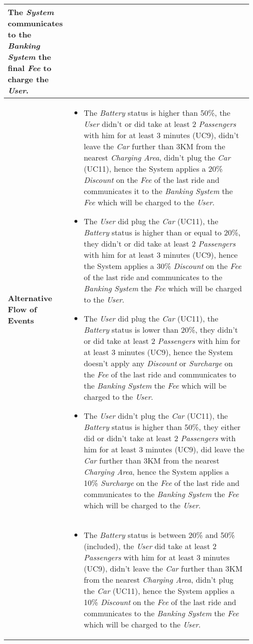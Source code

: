 \begin{longtable}{|p{0.2\linewidth} p{0.8\linewidth}|}
	The \emph{System} communicates to the \emph{Banking System} the final \emph{Fee} to charge the \emph{User}. \\ \hline
	\textbf{Alternative Flow of Events} & 
	\begin{itemize}
		\item The \emph{Battery} status is higher than 50\%, the \emph{User} didn't or did take at least 2 \emph{Passengers} with him for at least 3 minutes (UC9), didn't leave the \emph{Car} further than 3KM from the nearest \emph{Charging Area}, didn't plug the \emph{Car} (UC11), hence the System applies a 20\% \emph{Discount} on the \emph{Fee} of the last ride and communicates it to the \emph{Banking System} the \emph{Fee} which will be charged to the \emph{User}.
		\item The \emph{User} did plug the \emph{Car} (UC11), the \emph{Battery} status is higher than or equal to 20\%, they didn't or did take at least 2 \emph{Passengers} with him for at least 3 minutes (UC9), hence the System applies a 30\% \emph{Discount} on the \emph{Fee} of the last ride and communicates to the \emph{Banking System} the \emph{Fee} which will be charged to the \emph{User}.
		\item The \emph{User} did plug the \emph{Car} (UC11), the \emph{Battery} status is lower than 20\%, they didn't or did take at least 2 \emph{Passengers} with him for at least 3 minutes (UC9), hence the System doesn't apply any \emph{Discount} or \emph{Surcharge} on the \emph{Fee} of the last ride and communicates to the \emph{Banking System} the \emph{Fee} which will be charged to the \emph{User}.
		\item The \emph{User} didn't plug the \emph{Car} (UC11), the \emph{Battery} status is higher than 50\%, they either did or didn't take at least 2 \emph{Passengers} with him for at least 3 minutes (UC9), did leave the \emph{Car} further than 3KM from the nearest \emph{Charging Area}, hence the System applies a 10\% \emph{Surcharge} on the \emph{Fee} of the last ride and communicates to the \emph{Banking System} the \emph{Fee} which will be charged to the \emph{User}.
		\end{itemize} \\ &
		\begin{itemize}
		\item The \emph{Battery} status is between 20\% and 50\% (included), the \emph{User} did take at least 2 \emph{Passengers} with him for at least 3 minutes (UC9), didn't leave the \emph{Car} further than 3KM from the nearest \emph{Charging Area}, didn't plug the \emph{Car} (UC11), hence the System applies a 10\% \emph{Discount} on the \emph{Fee} of the last ride and communicates to the \emph{Banking System} the \emph{Fee} which will be charged to the \emph{User}.

\end{itemize}
\end{longtable}
